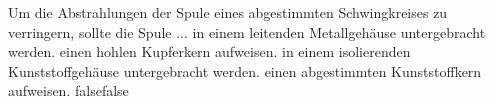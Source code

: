     {Um die Abstrahlungen der Spule eines abgestimmten Schwingkreises zu verringern, sollte die Spule ...}
    {in einem leitenden Metallgehäuse untergebracht werden.}
    {einen hohlen Kupferkern aufweisen.}
    {in einem isolierenden Kunststoffgehäuse untergebracht werden.}
    {einen abgestimmten Kunststoffkern aufweisen.}
    {false}{false}